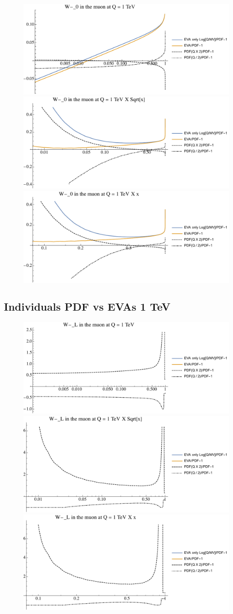\documentclass[a4paper,11pt]{article}
\begin{document}
\begin{figure}[ht]
\includegraphics[width=0.46\linewidth]{PlotPDFs/ratios/1TeV/W-_0_Q.pdf}
\includegraphics[width=0.46\linewidth]{PlotPDFs/ratios/1TeV/W-_0_Qsqrtx.pdf}
\includegraphics[width=0.46\linewidth]{PlotPDFs/ratios/1TeV/W-_0_Qx.pdf}
\end{figure}

\clearpage
\subsection{Individuals PDF vs EVAs 1 TeV}

\begin{figure}[ht]
\includegraphics[width=0.46\linewidth]{PlotPDFs/ratios/1TeV/W-_L_Q.pdf}
\includegraphics[width=0.46\linewidth]{PlotPDFs/ratios/1TeV/W-_L_Qsqrtx.pdf}
\includegraphics[width=0.46\linewidth]{PlotPDFs/ratios/1TeV/W-_L_Qx.pdf}
\end{figure}
\end{document}
